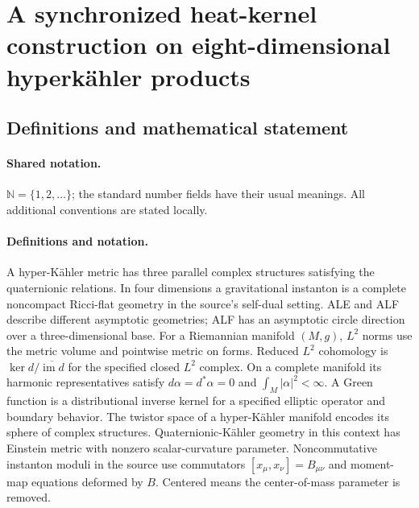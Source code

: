 \documentclass[11pt]{article}
\begin{document}
\section{A synchronized heat-kernel construction on eight-dimensional hyperkähler products}\label{statement}

\subsection{Definitions and mathematical statement}

\paragraph{Shared notation.}$\mathbb N=\{1,2,\ldots\}$; the standard number fields have their usual meanings. All additional conventions are stated locally.


\paragraph{Definitions and notation.}A hyper-Kähler metric has three parallel complex structures satisfying the quaternionic relations. In four dimensions a gravitational instanton is a complete noncompact Ricci-flat geometry in the source’s self-dual setting. ALE and ALF describe different asymptotic geometries; ALF has an asymptotic circle direction over a three-dimensional base. For a Riemannian manifold $(M,g)$, $L^2$ norms use the metric volume and pointwise metric on forms. Reduced $L^2$ cohomology is $\ker d/\overline{\operatorname{im}d}$ for the specified closed $L^2$ complex. On a complete manifold its harmonic representatives satisfy $d\alpha=d^*\alpha=0$ and $\int_M|\alpha|^2<\infty$. A Green function is a distributional inverse kernel for a specified elliptic operator and boundary behavior. The twistor space of a hyper-Kähler manifold encodes its sphere of complex structures. Quaternionic-Kähler geometry in this context has Einstein metric with nonzero scalar-curvature parameter. Noncommutative instanton moduli in the source use commutators $[x_\mu,x_\nu]=B_{\mu\nu}$ and moment-map equations deformed by $B$. Centered means the center-of-mass parameter is removed.
\end{document}
